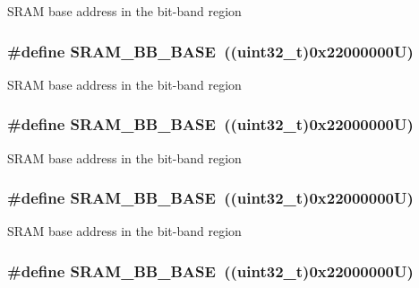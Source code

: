 S\-R\-A\-M base address in the bit-\/band region \hypertarget{group___peripheral__memory__map_gad3548b6e2f017f39d399358f3ac98454}{
\subsubsection[{S\-R\-A\-M\-\_\-\-B\-B\-\_\-\-B\-A\-S\-E}]{\setlength{\rightskip}{0pt plus 5cm}\#define S\-R\-A\-M\-\_\-\-B\-B\-\_\-\-B\-A\-S\-E~((uint32\-\_\-t)0x22000000\-U)}}\label{group___peripheral__memory__map_gad3548b6e2f017f39d399358f3ac98454}
S\-R\-A\-M base address in the bit-\/band region \hypertarget{group___peripheral__memory__map_gad3548b6e2f017f39d399358f3ac98454}{
\subsubsection[{S\-R\-A\-M\-\_\-\-B\-B\-\_\-\-B\-A\-S\-E}]{\setlength{\rightskip}{0pt plus 5cm}\#define S\-R\-A\-M\-\_\-\-B\-B\-\_\-\-B\-A\-S\-E~((uint32\-\_\-t)0x22000000\-U)}}\label{group___peripheral__memory__map_gad3548b6e2f017f39d399358f3ac98454}
S\-R\-A\-M base address in the bit-\/band region \hypertarget{group___peripheral__memory__map_gad3548b6e2f017f39d399358f3ac98454}{
\subsubsection[{S\-R\-A\-M\-\_\-\-B\-B\-\_\-\-B\-A\-S\-E}]{\setlength{\rightskip}{0pt plus 5cm}\#define S\-R\-A\-M\-\_\-\-B\-B\-\_\-\-B\-A\-S\-E~((uint32\-\_\-t)0x22000000\-U)}}\label{group___peripheral__memory__map_gad3548b6e2f017f39d399358f3ac98454}
S\-R\-A\-M base address in the bit-\/band region \hypertarget{group___peripheral__memory__map_gad3548b6e2f017f39d399358f3ac98454}{
\subsubsection[{S\-R\-A\-M\-\_\-\-B\-B\-\_\-\-B\-A\-S\-E}]{\setlength{\rightskip}{0pt plus 5cm}\#define S\-R\-A\-M\-\_\-\-B\-B\-\_\-\-B\-A\-S\-E~((uint32\-\_\-t)0x22000000\-U)}}\label{group___peripheral__memory__map_gad3548b6e2f017f39d399358f3ac98454}
